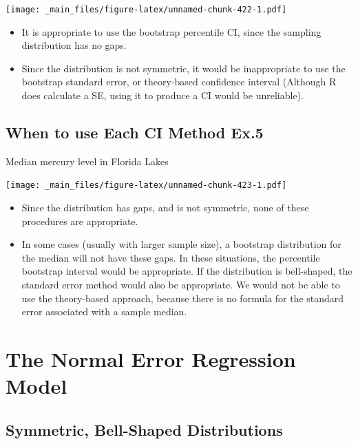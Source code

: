 \documentclass[]{book}
\providecommand{\tightlist}{%
  \setlength{\itemsep}{0pt}\setlength{\parskip}{0pt}}
\begin{document}
\texttt{[image: \_main\_files/figure-latex/unnamed-chunk-422-1.pdf]}

\begin{itemize}
\tightlist
\item
  It is appropriate to use the bootstrap percentile CI, since the
  sampling distribution has no gaps.\\
\item
  Since the distribution is not symmetric, it would be inappropriate to
  use the bootstrap standard error, or theory-based confidence interval
  (Although R does calculate a SE, using it to produce a CI would be
  unreliable).
\end{itemize}

\subsection{When to use Each CI Method
Ex.5}\label{when-to-use-each-ci-method-ex.5}

Median mercury level in Florida Lakes

\texttt{[image: \_main\_files/figure-latex/unnamed-chunk-423-1.pdf]}

\begin{itemize}
\tightlist
\item
  Since the distribution has gaps, and is not symmetric, none of these
  procedures are appropriate.\\
\item
  In some cases (usually with larger sample size), a bootstrap
  distribution for the median will not have these gaps. In these
  situations, the percentile bootstrap interval would be appropriate. If
  the distribution is bell-shaped, the standard error method would also
  be appropriate. We would not be able to use the theory-based approach,
  because there is no formula for the standard error associated with a
  sample median.
\end{itemize}

\section{The Normal Error Regression
Model}\label{the-normal-error-regression-model}

\subsection{Symmetric, Bell-Shaped
Distributions}\label{symmetric-bell-shaped-distributions}
\end{document}
